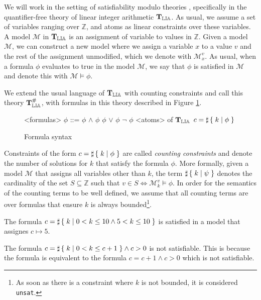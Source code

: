 
We will work in the setting of satisfiability modulo theories
\cite{barrett2009satisfiability}, specifically in the quantifier-free
theory of linear integer arithmetic $\operatorname{\mathbf{T}_{\mathbb{LIA}}}$. As usual, we assume a
set of variables ranging over $\mathbb{Z}$, and atoms as linear
constraints over these variables. A model $\mathcal{M}$ in $\operatorname{\mathbf{T}_{\mathbb{LIA}}}$ is
an assignment of variable to values in $\mathbb{Z}$. Given a model
$\mathcal{M}$, we can construct a new model where we assign a variable
$x$ to a value $v$ and the rest of the assignment unmodified, which we
denote with $\mathcal{M}^v_x$. As usual, when a formula $\phi$
evaluates to true in the model $\mathcal{M}$, we say that $\phi$ is
satisfied in $\mathcal{M}$ and denote this with $\mathcal{M} \vDash
\phi$.

We extend the usual language of $\operatorname{\mathbf{T}_{\mathbb{LIA}}}$ with counting constraints and
call this theory $\operatorname{\mathbf{T}^\#_{\mathbb{LIA}}}$, with formulas in this theory described in
Figure \ref{formula}.

\begin{figure}[h]
\begin{grammar}
<formulas> $\phi$ ::= $\phi$ $\land$ $\phi$
\alt $\phi$ $\lor$ $\phi$
\alt $\lnot$ $\phi$
\alt <atoms> of $\operatorname{\mathbf{T}_{\mathbb{LIA}}}$
\alt $c = \sharp\left\lbrace\;k\;|\;\phi\;\right\rbrace$
\end{grammar}

\caption{Formula syntax}
\label{formula}
\end{figure}

Constraints of the form $c = \sharp\left\lbrace\;k\;|\;\phi\;\right\rbrace$ are called
\emph{counting constraints} and denote the number of solutions for $k$
that satisfy the formula $\phi$.
More formally, given a model $\mathcal{M}$ that
assigns all variables other than $k$, the term $\sharp\left\lbrace\;k\;|\;\psi\;\right\rbrace$
denotes the cardinality of the set $S \subseteq \mathbb{Z}$ such that
$v \in S \iff \mathcal{M}^v_k \vDash \phi$. In order for the semantics
of the counting terms to be well defined, we assume that all counting
terms are over formulas that ensure $k$ is always bounded\footnote{As soon as there is a constraint where $k$ is not bounded, it is considered \texttt{unsat}.}.

\begin{example}
\label{ex:semantics}
The formula $c = \sharp\left\lbrace\;k\;|\;0 < k \le 10 \land 5 < k \le 10\;\right\rbrace$ is
satisfied in a model that assignes $c \mapsto 5$.
\end{example}

\begin{example}
\label{ex:simple}
The formula $c = \sharp\left\lbrace\;k\;|\;0 < k \le c + 1\;\right\rbrace \land c > 0$ is
not satisfiable. This is because the formula is equivalent to the
formula $c = c+1 \land c >0$ which is not satisfiable.
\end{example}

